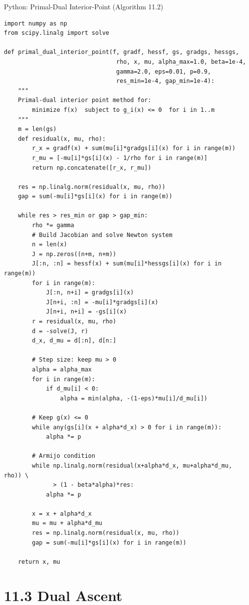 \documentclass[aspectratio=169,10pt]{beamer}
\begin{document}
\begin{frame}[fragile]{Python: Primal-Dual Interior-Point (Algorithm 11.2)}
\begin{lstlisting}[style=python]
import numpy as np
from scipy.linalg import solve

def primal_dual_interior_point(f, gradf, hessf, gs, gradgs, hessgs,
                                rho, x, mu, alpha_max=1.0, beta=1e-4,
                                gamma=2.0, eps=0.01, p=0.9,
                                res_min=1e-4, gap_min=1e-4):
    """
    Primal-dual interior point method for:
        minimize f(x)  subject to g_i(x) <= 0  for i in 1..m
    """
    m = len(gs)
    def residual(x, mu, rho):
        r_x = gradf(x) + sum(mu[i]*gradgs[i](x) for i in range(m))
        r_mu = [-mu[i]*gs[i](x) - 1/rho for i in range(m)]
        return np.concatenate([r_x, r_mu])

    res = np.linalg.norm(residual(x, mu, rho))
    gap = sum(-mu[i]*gs[i](x) for i in range(m))

    while res > res_min or gap > gap_min:
        rho *= gamma
        # Build Jacobian and solve Newton system
        n = len(x)
        J = np.zeros((n+m, n+m))
        J[:n, :n] = hessf(x) + sum(mu[i]*hessgs[i](x) for i in range(m))
        for i in range(m):
            J[:n, n+i] = gradgs[i](x)
            J[n+i, :n] = -mu[i]*gradgs[i](x)
            J[n+i, n+i] = -gs[i](x)
        r = residual(x, mu, rho)
        d = -solve(J, r)
        d_x, d_mu = d[:n], d[n:]

        # Step size: keep mu > 0
        alpha = alpha_max
        for i in range(m):
            if d_mu[i] < 0:
                alpha = min(alpha, -(1-eps)*mu[i]/d_mu[i])

        # Keep g(x) <= 0
        while any(gs[i](x + alpha*d_x) > 0 for i in range(m)):
            alpha *= p

        # Armijo condition
        while np.linalg.norm(residual(x+alpha*d_x, mu+alpha*d_mu, rho)) \
              > (1 - beta*alpha)*res:
            alpha *= p

        x = x + alpha*d_x
        mu = mu + alpha*d_mu
        res = np.linalg.norm(residual(x, mu, rho))
        gap = sum(-mu[i]*gs[i](x) for i in range(m))

    return x, mu
\end{lstlisting}
\end{frame}

\section{11.3 Dual Ascent}
\end{document}
